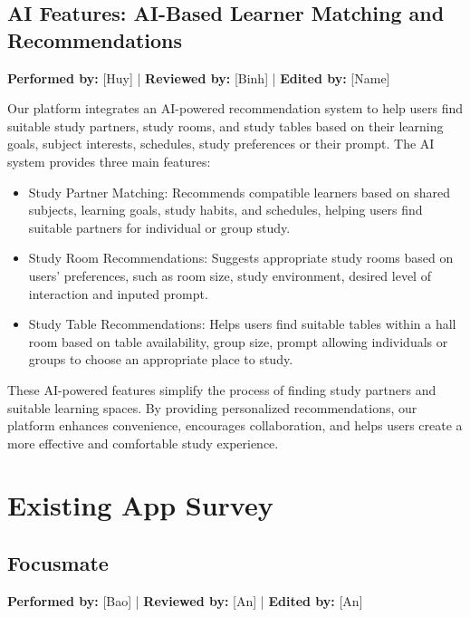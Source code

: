 \documentclass[12pt]{article}
\begin{document}
\subsection{AI Features: AI-Based Learner Matching and Recommendations}
\textbf{Performed by:} [Huy] | \textbf{Reviewed by:} [Binh] | \textbf{Edited by:} [Name]

Our platform integrates an AI-powered recommendation system to help users find suitable study partners, study rooms, and study tables based on their learning goals, subject interests, schedules, study preferences or their prompt.
The AI system provides three main features:
\begin{itemize}
    \item Study Partner Matching: Recommends compatible learners based on shared subjects, learning goals, study habits, and schedules, helping users find suitable partners for individual or group study.
    \item Study Room Recommendations: Suggests appropriate study rooms based on users' preferences, such as room size, study environment, desired level of interaction  and inputed prompt.
    \item Study Table Recommendations: Helps users find suitable tables within a hall room based on table availability, group size, prompt allowing individuals or groups to choose an appropriate place to study.
\end{itemize}

These AI-powered features simplify the process of finding study partners and suitable learning spaces. By providing personalized recommendations, our platform enhances convenience, encourages collaboration, and helps users create a more effective and comfortable study experience.

\pagebreak
\section{Existing App Survey}

\subsection{Focusmate}

\textbf{Performed by:} [Bao] | \textbf{Reviewed by:} [An] | \textbf{Edited by:} [An]
\end{document}
